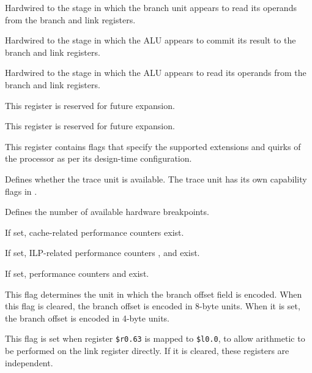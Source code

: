 \reset{****}
Hardwired to the stage in which the branch unit appears to read its operands 
from the branch and link registers.

\reset{****}
Hardwired to the stage in which the ALU appears to commit its result to the
branch and link registers.

\reset{****}
Hardwired to the stage in which the ALU appears to read its operands from the
branch and link registers.


This register is reserved for future expansion.


This register is reserved for future expansion.


This register contains flags that specify the supported extensions and quirks
of the processor as per its design-time configuration.

\reset{***}
Defines whether the trace unit is available. The trace unit has its own
capability flags in .

\reset{***}
Defines the number of available hardware breakpoints.

\reset{*}
If set, cache-related performance counters exist.

\reset{*}
If set, ILP-related performance counters ,  and  exist.

\reset{*}
If set, performance counters  and  exist.

\reset{*}
This flag determines the unit in which the branch offset field is encoded. When
this flag is cleared, the branch offset is encoded in 8-byte units. When it is
set, the branch offset is encoded in 4-byte units.

\reset{*}
This flag is set when register \texttt{\$r0.63} is mapped to \texttt{\$l0.0}, to
allow arithmetic to be performed on the link register directly. If it is
cleared, these registers are independent.

